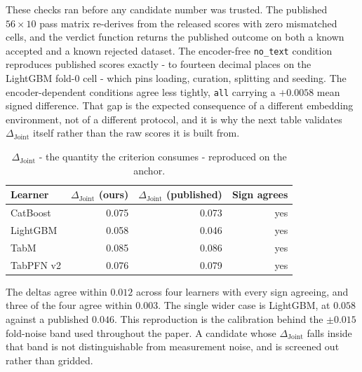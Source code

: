\documentclass{article}
\newcommand{\djoint}{\Delta_{\text{Joint}}}
\begin{document}
\noindent These checks ran before any candidate number was trusted. The published $56 \times 10$ pass
matrix re-derives from the released scores with zero mismatched cells, and the verdict function
returns the published outcome on both a known accepted and a known rejected dataset. The
encoder-free \texttt{no\_text} condition reproduces published scores exactly - to fourteen
decimal places on the LightGBM fold-0 cell - which pins loading, curation, splitting and
seeding. The encoder-dependent conditions agree less tightly, \texttt{all} carrying a
$+0.0058$ mean signed difference. That gap is the expected consequence of a different embedding
environment, not of a different protocol, and it is why the next table validates $\djoint$ itself
rather than the raw scores it is built from.


\begin{table}[H]
\centering\small
\caption{$\djoint$ - the quantity the criterion consumes - reproduced on the anchor.}
\begin{tabular}{lrrr}
\toprule
Learner & $\djoint$ (ours) & $\djoint$ (published) & Sign agrees \\
\midrule
CatBoost  & 0.075 & 0.073 & yes \\
LightGBM  & 0.058 & 0.046 & yes \\
TabM      & 0.085 & 0.086 & yes \\
TabPFN v2 & 0.076 & 0.079 & yes \\
\bottomrule
\end{tabular}
\end{table}

\noindent The deltas agree within $0.012$ across four learners with every sign agreeing, and three of the
four agree within $0.003$. The single wider case is LightGBM, at $0.058$ against a published
$0.046$. This reproduction is the calibration behind the $\pm 0.015$ fold-noise band used
throughout the paper. A candidate whose $\djoint$ falls inside that band is not distinguishable
from measurement noise, and is screened out rather than gridded.
\end{document}
